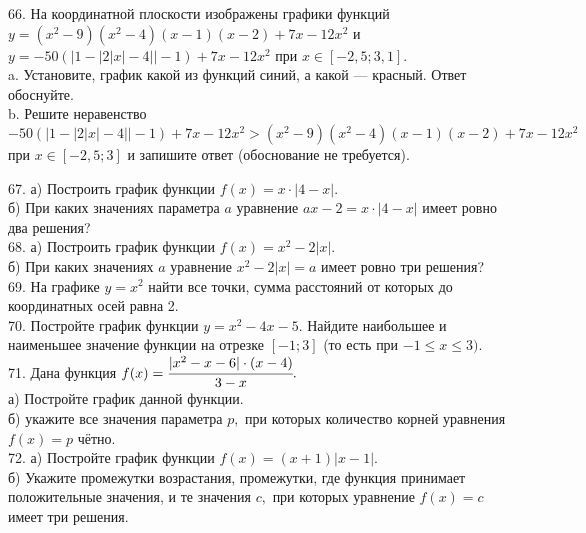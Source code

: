 66. На координатной плоскости изображены графики функций $y=(x^2-9)(x^2-4)(x-1)(x-2)+7x-12x^2$ и $y=-50(|1-|2|x|-4||-1)+7x-12x^2$ при
$x\in[-2,5;3,1].$\\
a. Установите, график какой из функций синий, а какой --- красный. Ответ обоснуйте.\\
b. Решите неравенство  $-50(|1-|2|x|-4||-1)+7x-12x^2 >(x^2-9)(x^2-4)(x-1)(x-2)+7x-12x^2$ при
$x\in[-2,5;3]$ и запишите ответ (обоснование не требуется).
\begin{center}\end{center}
67. а) Построить график функции $f(x)=x\cdot|4-x|.$\\
б) При каких значениях параметра $a$ уравнение $ax-2=x\cdot|4-x|$ имеет ровно два решения?\\
68. а) Построить график функции $f(x)=x^2-2|x|.$\\
б) При каких значениях $a$ уравнение $x^2-2|x|=a$ имеет ровно три решения?\\
69. На графике $y=x^2$ найти все точки, сумма расстояний от которых до координатных осей равна 2.\\
70. Постройте график функции $y=x^2-4x-5.$ Найдите наибольшее и наименьшее значение функции на отрезке $[-1;3]$ (то есть при $-1\leqslant x \leqslant 3).$\\
71. Дана функция $f(x)=\cfrac{|x^2-x-6|\cdot(x-4)}{3-x}.$\\
а) Постройте график данной функции.\\
б) укажите все значения параметра $p,$ при которых количество корней уравнения $f(x)=p$ чётно.\\
72. а) Постройте график функции $f(x)=(x+1)|x-1|.$\\
б) Укажите промежутки возрастания, промежутки, где функция принимает положительные значения, и те значения $c,$ при которых уравнение $f(x)=c$ имеет три решения.\\
